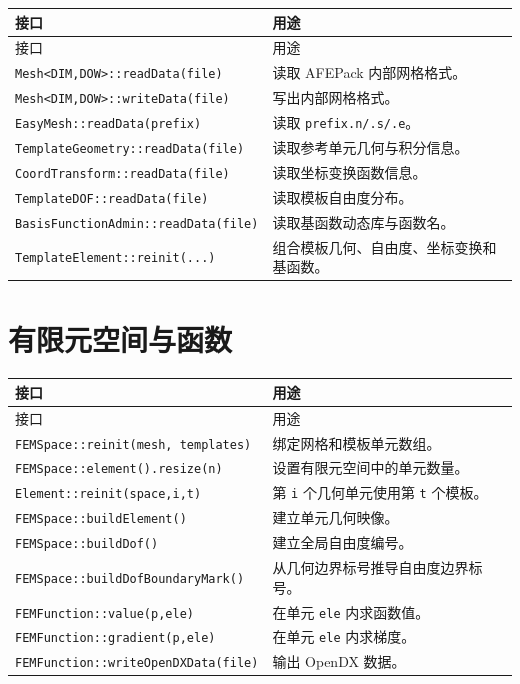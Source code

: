 \documentclass[UTF8,openany,zihao=-4,scheme=chinese]{ctexbook}
\newcommand{\file}[1]{\nolinkurl{#1}}
\newcommand{\class}[1]{\texttt{#1}}
\newcommand{\cmd}[1]{\texttt{#1}}
\begin{document}
\begin{longtable}{p{}p{}}
\toprule
接口 & 用途\\
\midrule
\endfirsthead
\toprule
接口 & 用途\\
\midrule
\endhead
\class{Mesh<DIM,DOW>::readData(file)} & 读取 AFEPack 内部网格格式。\\
\class{Mesh<DIM,DOW>::writeData(file)} & 写出内部网格格式。\\
\class{EasyMesh::readData(prefix)} & 读取 \file{prefix.n/.s/.e}。\\
\class{TemplateGeometry::readData(file)} & 读取参考单元几何与积分信息。\\
\class{CoordTransform::readData(file)} & 读取坐标变换函数信息。\\
\class{TemplateDOF::readData(file)} & 读取模板自由度分布。\\
\class{BasisFunctionAdmin::readData(file)} & 读取基函数动态库与函数名。\\
\class{TemplateElement::reinit(...)} & 组合模板几何、自由度、坐标变换和基函数。\\
\bottomrule
\end{longtable}

\section{有限元空间与函数}

\begin{longtable}{p{}p{}}
\toprule
接口 & 用途\\
\midrule
\endfirsthead
\toprule
接口 & 用途\\
\midrule
\endhead
\class{FEMSpace::reinit(mesh, templates)} & 绑定网格和模板单元数组。\\
\class{FEMSpace::element().resize(n)} & 设置有限元空间中的单元数量。\\
\class{Element::reinit(space,i,t)} & 第 \cmd{i} 个几何单元使用第 \cmd{t} 个模板。\\
\class{FEMSpace::buildElement()} & 建立单元几何映像。\\
\class{FEMSpace::buildDof()} & 建立全局自由度编号。\\
\class{FEMSpace::buildDofBoundaryMark()} & 从几何边界标号推导自由度边界标号。\\
\class{FEMFunction::value(p,ele)} & 在单元 \cmd{ele} 内求函数值。\\
\class{FEMFunction::gradient(p,ele)} & 在单元 \cmd{ele} 内求梯度。\\
\class{FEMFunction::writeOpenDXData(file)} & 输出 OpenDX 数据。\\
\bottomrule
\end{longtable}
\end{document}
